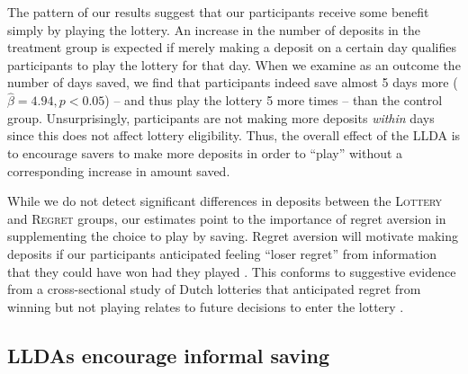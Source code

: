 \documentclass[12pt]{article}
\begin{document}

		The pattern of our results suggest that our participants receive some benefit simply by playing the lottery. An increase in the number of deposits in the treatment group is expected if merely making a deposit on a certain day qualifies participants to play the lottery for that day. When we examine as an outcome the number of days saved, we find that participants indeed save almost 5 days more ($\hat \beta = 4.94, p < 0.05$) -- and thus play the lottery 5 more times -- than the control group. Unsurprisingly, participants are not making more deposits \textit{within} days since this does not affect lottery eligibility. Thus, the overall effect of the LLDA is to encourage savers to make more deposits in order to ``play'' without a corresponding increase in amount saved. %


		While we do not detect significant differences in deposits between the \textsc{Lottery} and \textsc{Regret} groups, our estimates point to the importance of regret aversion in supplementing the choice to play by saving. Regret aversion will motivate making deposits if our participants anticipated feeling ``loser regret'' from information that they could have won had they played . This conforms to suggestive evidence from a cross-sectional study of Dutch lotteries that anticipated regret from winning but not playing relates to future decisions to enter the lottery .


	\subsection{LLDAs encourage informal saving}

\end{document}
